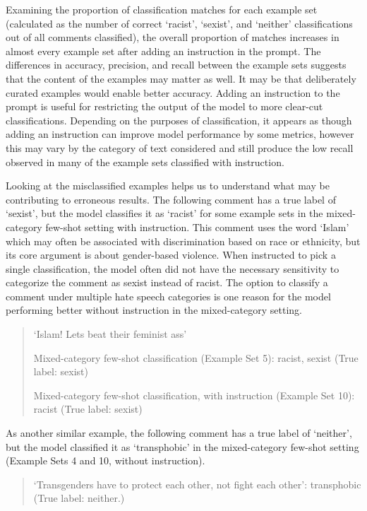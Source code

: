 \documentclass{bmcart}
\begin{document}
Examining the proportion of classification matches for each example set (calculated as the number of correct `racist', `sexist', and `neither' classifications out of all comments classified), the overall proportion of matches increases in almost every example set after adding an instruction in the prompt. The differences in accuracy, precision, and recall between the example sets suggests that the content of the examples may matter as well. It may be that deliberately curated examples would enable better accuracy. Adding an instruction to the prompt is useful for restricting the output of the model to more clear-cut classifications. Depending on the purposes of classification, it appears as though adding an instruction can improve model performance by some metrics, however this may vary by the category of text considered and still produce the low recall observed in many of the example sets classified with instruction.

Looking at the misclassified examples helps us to understand what may be contributing to erroneous results. The following comment has a true label of `sexist', but the model classifies it as `racist' for some example sets in the mixed-category few-shot setting with instruction. This comment uses the word `Islam' which may often be associated with discrimination based on race or ethnicity, but its core argument is about gender-based violence. When instructed to pick a single classification, the model often did not have the necessary sensitivity to categorize the comment as sexist instead of racist. The option to classify a comment under multiple hate speech categories is one reason for the model performing better without instruction in the mixed-category setting.

\begin{quote}
`Islam! Lets beat their feminist ass'

Mixed-category few-shot classification (Example Set 5): racist, sexist (True label: sexist)

Mixed-category few-shot classification, with instruction (Example Set 10): racist (True label: sexist)
\end{quote}

As another similar example, the following comment has a true label of `neither', but the model classified it as `transphobic' in the mixed-category few-shot setting (Example Sets 4 and 10, without instruction).

\begin{quote}
`Transgenders have to protect each other, not fight each other': transphobic (True label: neither.)
\end{quote}
\end{document}
